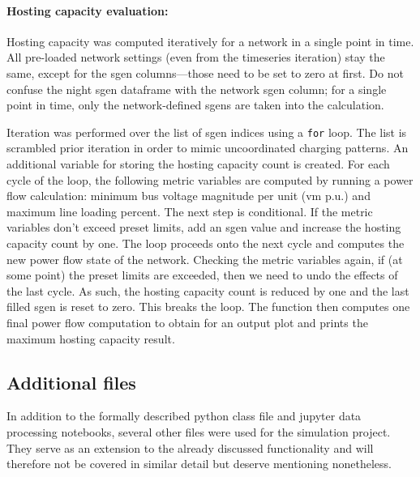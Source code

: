 \documentclass[a4paper,10pt]{report}
\begin{document}
\paragraph{Hosting capacity evaluation:} Hosting capacity was computed iteratively for a network in a single point in time. All pre-loaded network settings (even from the timeseries iteration) stay the same, except for the sgen columns---those need to be set to zero at first. Do not confuse the night sgen dataframe with the network sgen column; for a single point in time, only the network-defined sgens are taken into the calculation.

Iteration was performed over the list of sgen indices using a \texttt{for} loop. The list is scrambled prior iteration in order to mimic uncoordinated charging patterns. An additional variable for storing the hosting capacity count is created. For each cycle of the loop, the following metric variables are computed by running a power flow calculation: minimum bus voltage magnitude per unit (vm p.u.) and maximum line loading percent. The next step is conditional. If the metric variables don't exceed preset limits, add an sgen value and increase the hosting capacity count by one. The loop proceeds onto the next cycle and computes the new power flow state of the network. Checking the metric variables again, if (at some point) the preset limits are exceeded, then we need to undo the effects of the last cycle. As such, the hosting capacity count is reduced by one and the last filled sgen is reset to zero. This breaks the loop. The function then computes one final power flow computation to obtain for an output plot and prints the maximum hosting capacity result.

\subsection{Additional files}\label{subsection_additional}
In addition to the formally described python class file and jupyter data processing notebooks, several other files were used for the simulation project. They serve as an extension to the already discussed functionality and will therefore not be covered in similar detail but deserve mentioning nonetheless.
\end{document}
